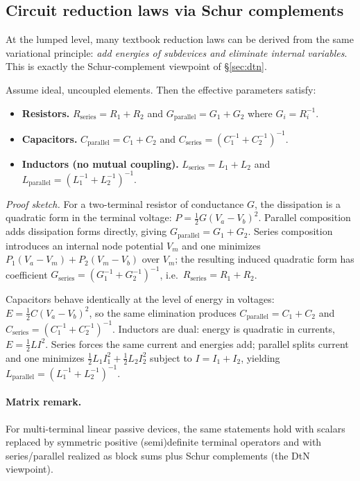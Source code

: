 \documentclass[11pt]{article}
\begin{document}
\subsection{Circuit reduction laws via Schur complements}
\label{sec:circuit-reductions}
At the lumped level, many textbook reduction laws can be derived from the same variational principle: \emph{add energies of subdevices and eliminate internal variables}.
This is exactly the Schur-complement viewpoint of \S\ref{sec:dtn}.

\begin{proposition}\label{prop:series-parallel}
Assume ideal, uncoupled elements.
Then the effective parameters satisfy:
\begin{itemize}
  \item \textbf{Resistors.} $R_{\mathrm{series}}=R_1+R_2$ and $G_{\mathrm{parallel}}=G_1+G_2$ where $G_i=R_i^{-1}$.
  \item \textbf{Capacitors.} $C_{\mathrm{parallel}}=C_1+C_2$ and $C_{\mathrm{series}}=(C_1^{-1}+C_2^{-1})^{-1}$.
  \item \textbf{Inductors (no mutual coupling).} $L_{\mathrm{series}}=L_1+L_2$ and $L_{\mathrm{parallel}}=(L_1^{-1}+L_2^{-1})^{-1}$.
\end{itemize}
\end{proposition}

\noindent\emph{Proof sketch.}
For a two-terminal resistor of conductance $G$, the dissipation is a quadratic form in the terminal voltage: $P=\tfrac12 G(V_a-V_b)^2$.
Parallel composition adds dissipation forms directly, giving $G_{\mathrm{parallel}}=G_1+G_2$.
Series composition introduces an internal node potential $V_m$ and one minimizes $P_1(V_a-V_m)+P_2(V_m-V_b)$ over $V_m$; the resulting induced quadratic form has coefficient $G_{\mathrm{series}}=(G_1^{-1}+G_2^{-1})^{-1}$, i.e.\ $R_{\mathrm{series}}=R_1+R_2$.

Capacitors behave identically at the level of energy in voltages: $E=\tfrac12 C(V_a-V_b)^2$, so the same elimination produces $C_{\mathrm{parallel}}=C_1+C_2$ and $C_{\mathrm{series}}=(C_1^{-1}+C_2^{-1})^{-1}$.
Inductors are dual: energy is quadratic in currents, $E=\tfrac12 L I^2$.
Series forces the same current and energies add; parallel splits current and one minimizes $\tfrac12 L_1 I_1^2+\tfrac12 L_2 I_2^2$ subject to $I=I_1+I_2$, yielding $L_{\mathrm{parallel}}=(L_1^{-1}+L_2^{-1})^{-1}$.

\paragraph{Matrix remark.}
For multi-terminal linear passive devices, the same statements hold with scalars replaced by symmetric positive (semi)definite terminal operators and with series/parallel realized as block sums plus Schur complements (the DtN viewpoint).
\end{document}

